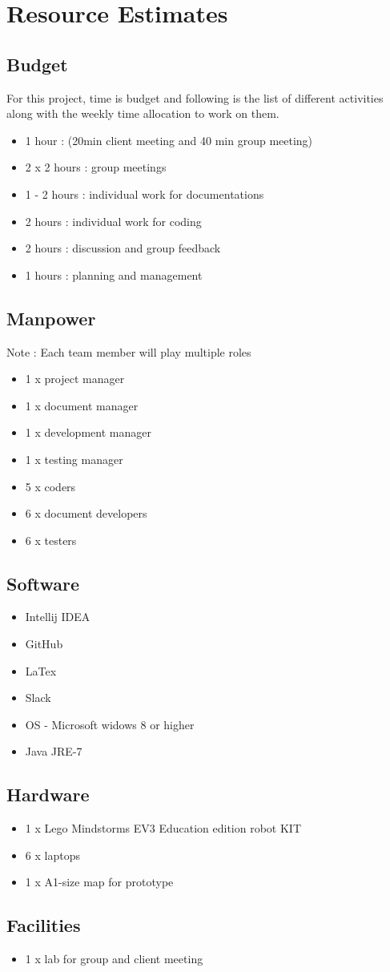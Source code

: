 \section{Resource Estimates}

\subsection{Budget}
For this project, time is budget and following is the list of different activities along with the weekly time allocation to work on them.  
\begin{itemize}
\item 1 hour  : (20min client meeting and 40 min group meeting)
\item 2 x 2 hours : group meetings 
\item 1 - 2 hours : individual work for documentations
\item 2 hours : individual work for coding 
\item 2 hours : discussion and group feedback  
\item 1 hours : planning and management
\end{itemize}

\subsection{Manpower}
Note : Each team member will play multiple roles 
\begin{itemize}
\item 1 x project manager
\item 1 x document manager
\item 1 x development manager
\item 1 x testing manager
\item 5 x coders
\item 6 x document developers
\item 6 x testers
\end{itemize}
\subsection{Software}
\begin{itemize}
\item Intellij IDEA
\item GitHub
\item LaTex
\item Slack
\item OS - Microsoft widows 8 or higher
\item Java JRE-7
\end{itemize}

\subsection{Hardware}
\begin{itemize}
\item 1 x Lego Mindstorms EV3 Education edition robot KIT
\item 6 x laptops
\item 1 x A1-size map for prototype
\end{itemize}

\subsection{Facilities}
\begin{itemize}
\item 1 x lab for group and client meeting 
\end{itemize}
